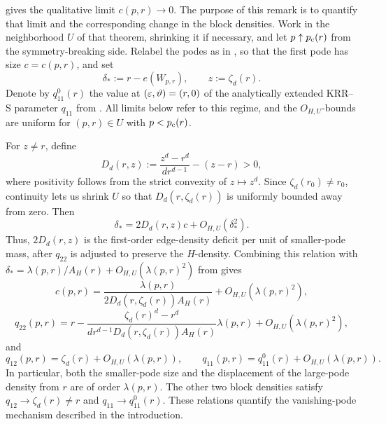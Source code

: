 \begin{remark}
\label{rmk:bipodal-parameter-expansions}
 gives the qualitative limit
\(c(p,r)\to0\).  The purpose of this remark is to quantify that limit and the
corresponding change in the block densities.  Work in the neighborhood $U$
of that theorem, shrinking it if necessary, and let \(p\uparrow p_{\mathrm c}(r)\)
from the symmetry-breaking side.  Relabel the podes as in , so
that the first pode has size \(c=c(p,r)\), and set
\[
  \delta_*:=r-e(W_{p,r}),
  \qquad
  z:=\zeta_d(r).
\]
Denote by \(q_{11}^0(r)\) the value at
\((\varepsilon,\vartheta)=(r,0)\) of the analytically extended KRR--S parameter
\(q_{11}\) from .
All limits below refer to this regime, and the $O_{H,U}$-bounds are uniform
for $(p,r)\in U$ with $p<p_{\mathrm c}(r)$.

For \(z\ne r\), define
\begin{equation}\label{eq:edge-deficit-coefficient}
  D_d(r,z):=\frac{z^d-r^d}{d r^{d-1}}-(z-r)>0,
\end{equation}
where positivity follows from the strict convexity of \(z\mapsto z^d\).
Since $\zeta_d(r_0)\ne r_0$, continuity lets us shrink $U$ so that
$D_d(r,\zeta_d(r))$ is uniformly bounded away from zero.
Then
\[
  \delta_*=2D_d(r,z)c+O_{H,U}(\delta_*^2).
\]
Thus, \(2D_d(r,z)\) is the first-order edge-density deficit per unit of
smaller-pode mass, after \(q_{22}\) is adjusted to preserve the
\(H\)-density.  Combining this relation with
\(\delta_*=\lambda(p,r)/A_H(r)+O_{H,U}(\lambda(p,r)^2)\) from
 gives
\begin{equation}\label{eq:optimizer-block-size}
  c(p,r)=
  \frac{\lambda(p,r)}
  {2D_d(r,\zeta_d(r))A_H(r)}
  +O_{H,U}(\lambda(p,r)^2),
\end{equation}
\begin{equation}\label{eq:optimizer-block-density}
  q_{22}(p,r)
  =
  r-
  \frac{\zeta_d(r)^d-r^d}
       {d r^{d-1}D_d(r,\zeta_d(r))A_H(r)}
  \lambda(p,r)
  +O_{H,U}(\lambda(p,r)^2),
\end{equation}
and
\[
  q_{12}(p,r)=\zeta_d(r)+O_{H,U}(\lambda(p,r)),
  \qquad
  q_{11}(p,r)=q_{11}^0(r)+O_{H,U}(\lambda(p,r)).
\]
In particular, both the smaller-pode size and the displacement of the
large-pode density from \(r\) are of order \(\lambda(p,r)\).
The other two block densities satisfy
\(q_{12}\to\zeta_d(r)\ne r\) and
\(q_{11}\to q_{11}^0(r)\).  These relations quantify the vanishing-pode
mechanism described in the introduction.


\end{remark}

